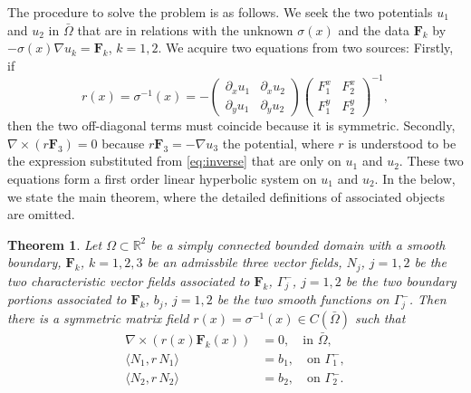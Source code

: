 \documentclass[a4paper,11pt]{article}
\def\F{\mathbf{F}}
\newtheorem{theorem}{Theorem}[section]
\begin{document}
The procedure to solve the problem is as follows. We seek the two potentials $u_1$ and $u_2$ in $\bar\Omega$ that are in relations with the unknown $\sigma(x)$ and the data $\F_k$ by $-\sigma(x)\nabla u_k = \F_k$, $k=1,2$. We acquire two equations from two sources: Firstly, if
\begin{equation}
r(x) = \sigma^{-1}(x) = -\begin{pmatrix} \partial_x u_1 & \partial_x u_2 \\ \partial_y u_1 & \partial_y u_2 \end{pmatrix}
\begin{pmatrix} F^x_1 & F^x_2 \\ F^y_1 & F^y_2 \end{pmatrix}^{-1}, \label{eq:inverse}                                                                    
\end{equation}
then the two off-diagonal terms must coincide because it is symmetric. Secondly, $ \nabla\times (r\F_3) = 0$ because $r\F_3=-\nabla u_3$ the potential, where $r$ is understood to be the expression substituted from \eqref{eq:inverse} that are only on $u_1$ and $u_2$. These two equations form a first order linear hyperbolic system on $u_1$ and $u_2$. In the below, we state the main theorem, where the detailed definitions of associated objects are omitted.
\begin{theorem}
 Let $\Omega\subset \mathbb{R}^2$ be a simply connected bounded domain with a smooth boundary, $\F_k$, $k=1,2,3$ be an admissbile three vector fields, $N_j$, $j=1,2$ be the two characteristic vector fields associated to $\F_k$, $\Gamma_j^-$, $j=1,2$ be the two boundary portions associated to $\F_k$, $b_j$, $j=1,2$ be the two smooth functions on $\Gamma_j^-$. Then there is a symmetric matrix field $r(x)=\sigma^{-1}(x) \in C(\bar\Omega)$ such that
 \begin{align}
  \nabla \times (r(x)\F_k(x)) &=0, \quad \text{in $\bar\Omega$},\\
  \langle N_1, r\,N_1\rangle &=b_1, \quad \text{on $\Gamma_1^-$},\\
  \langle N_2, r\,N_2\rangle &=b_2, \quad \text{on $\Gamma_2^-$}.
 \end{align}
\end{theorem}
\end{document}
